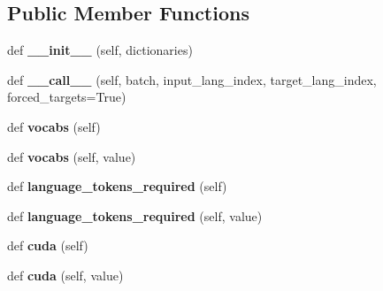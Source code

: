 \subsection*{Public Member Functions}
\begin{DoxyCompactItemize}
\item 
def {\bfseries \+\_\+\+\_\+init\+\_\+\+\_\+} (self, dictionaries)\hypertarget{classmodules_1_1WordTranslator_af425f7faa8ea8b88bddbbfe00a81d9b5}{}\label{classmodules_1_1WordTranslator_af425f7faa8ea8b88bddbbfe00a81d9b5}

\item 
def {\bfseries \+\_\+\+\_\+call\+\_\+\+\_\+} (self, batch, input\+\_\+lang\+\_\+index, target\+\_\+lang\+\_\+index, forced\+\_\+targets=True)\hypertarget{classmodules_1_1WordTranslator_a5add89ba5016fca7f2d0923a4f0e8bf3}{}\label{classmodules_1_1WordTranslator_a5add89ba5016fca7f2d0923a4f0e8bf3}

\item 
def {\bfseries vocabs} (self)\hypertarget{classmodules_1_1WordTranslator_a3c870067862ad54813f475ab846cae0e}{}\label{classmodules_1_1WordTranslator_a3c870067862ad54813f475ab846cae0e}

\item 
def {\bfseries vocabs} (self, value)\hypertarget{classmodules_1_1WordTranslator_a83dbe0e47ed234e201694f557e927623}{}\label{classmodules_1_1WordTranslator_a83dbe0e47ed234e201694f557e927623}

\item 
def {\bfseries language\+\_\+tokens\+\_\+required} (self)\hypertarget{classmodules_1_1WordTranslator_a5bb915bc2fabf07a8440a0a71664365f}{}\label{classmodules_1_1WordTranslator_a5bb915bc2fabf07a8440a0a71664365f}

\item 
def {\bfseries language\+\_\+tokens\+\_\+required} (self, value)\hypertarget{classmodules_1_1WordTranslator_a619c53087b12a4db54f8bb50baee7ff0}{}\label{classmodules_1_1WordTranslator_a619c53087b12a4db54f8bb50baee7ff0}

\item 
def {\bfseries cuda} (self)\hypertarget{classmodules_1_1WordTranslator_a1f565d722ce54d85a1b5c2f89c1e9c54}{}\label{classmodules_1_1WordTranslator_a1f565d722ce54d85a1b5c2f89c1e9c54}

\item 
def {\bfseries cuda} (self, value)\hypertarget{classmodules_1_1WordTranslator_a0678851eb1d6352a00962cceeb54bb15}{}\label{classmodules_1_1WordTranslator_a0678851eb1d6352a00962cceeb54bb15}

\end{DoxyCompactItemize}
